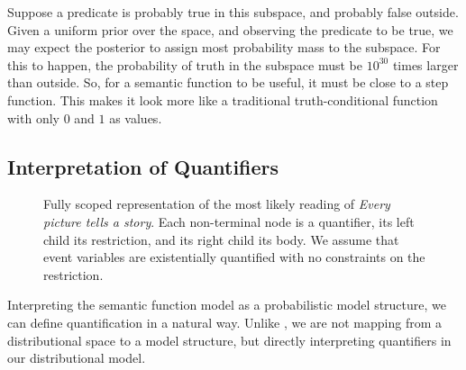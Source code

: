 \documentclass[a4paper,11pt]{article}
\begin{document}
Suppose a predicate is probably true in this subspace,
and probably false outside.
Given a uniform prior over the space,
and observing the predicate to be true,
we may expect the posterior to assign most probability mass to the subspace.
For this to happen, the probability of truth in the subspace
must be $10^{30}$ times larger than outside.
So, for a semantic function to be useful,
it must be close to a step function.
This makes it look more like
a traditional truth-conditional function with only $0$ and $1$ as values.


\pagebreak

\subsection{Interpretation of Quantifiers}
\label{sec:quant}
\vspace*{-1mm}

\begin{figure}
\center
{}
\vspace*{-1mm}
\caption{
Fully scoped representation of the most likely reading of \textit{Every picture tells a story}.
Each non-terminal node is a quantifier, its left child its restriction, and its right child its body.
We assume that event variables are existentially quantified with no constraints on the restriction.
}
\label{fig:scope}
\vspace*{-4mm}
\end{figure}

Interpreting the semantic function model as a probabilistic model structure,
we can define quantification in a natural way.
Unlike \citet{herbelot2015quantifier},
we are not mapping from a distributional space to a model structure,
but directly interpreting quantifiers in our distributional model.
\end{document}
